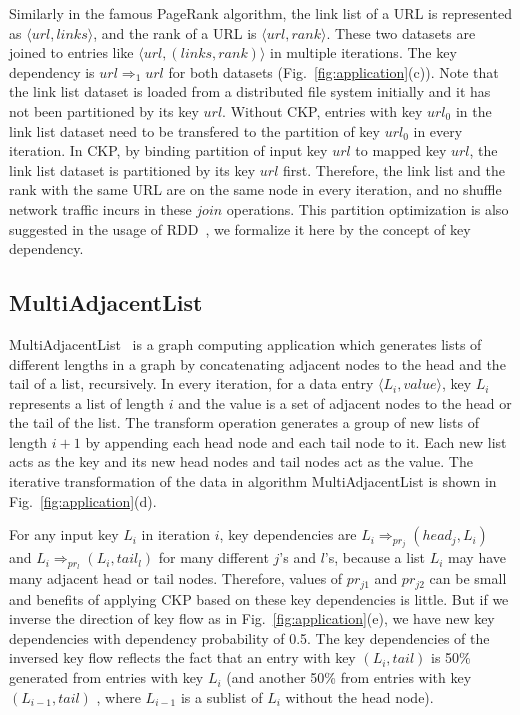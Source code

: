 \documentclass[10pt,journal,compsoc]{IEEEtran}
\begin{document}
Similarly in the famous PageRank algorithm, 
the link list of a URL is represented as $\langle url, links \rangle$,
and the rank of a URL is $\langle url, rank \rangle$. 
These two datasets are joined to entries 
like $\langle url, (links, rank) \rangle$ in multiple iterations.
The key dependency is $url \Rightarrow_{1} url$ for both datasets (Fig.~\ref{fig:application}(c)).
Note that the link list dataset is loaded from a distributed 
file system initially and it has not been partitioned 
by its key $url$. 
Without CKP, entries with key $url_0$ in the link list dataset need
to be transfered to the partition of key $url_0$ in every iteration.
In CKP, by binding partition of input key $url$ to mapped key $url$, 
the link list dataset is partitioned by its key $url$ first.
Therefore, the link list and the rank with the same URL 
are on the same node in every iteration, 
and no shuffle network traffic incurs in these $join$ operations. 
This partition optimization is also suggested in the usage 
of RDD~\cite{zaharia2012resilient}, 
we formalize it here by the concept of key dependency.


\subsection{MultiAdjacentList}
MultiAdjacentList~\cite{multiAdjList} is
a graph computing application which generates 
lists of different lengths in a graph by concatenating adjacent nodes 
to the head and the tail of a list, recursively.
In every iteration, for a data entry $\langle L_i, value \rangle$,
key $L_i$ represents a list of length $i$ and 
the value is a set of adjacent nodes to the head or the tail of the list.
The transform operation
generates a group of new lists of length $i+1$ by appending each head
node and each tail node to it. Each new list acts as the key and
its new head nodes and tail nodes act as the value.
The iterative transformation of the data in algorithm MultiAdjacentList is shown in Fig.~\ref{fig:application}(d).

For any input key $L_i$ in iteration $i$, key dependencies 
are $L_i \Rightarrow_{pr_{j}} (head_{j}, L_i)$ and 
$L_i \Rightarrow_{pr_{l}} (L_i, tail_{l})$ for many different 
$j$'s and $l$'s, because a list $L_i$ may have many adjacent head
or tail nodes. Therefore, values of $pr_{j1}$ and $pr_{j2}$ can be 
small and benefits of applying CKP based on these 
key dependencies is little.
But if we inverse the direction of key flow as 
in Fig.~\ref{fig:application}(e), we have new key dependencies with 
dependency probability of 0.5. 
The key dependencies of the inversed key flow 
reflects the fact that
an entry with key $(L_i, tail)$ is 50\% generated from entries with 
key $L_i$ (and another 50\% from entries with key $(L_{i-1}, tail)$
, where $L_{i-1}$ is a sublist of $L_i$ without the head node).
\end{document}
